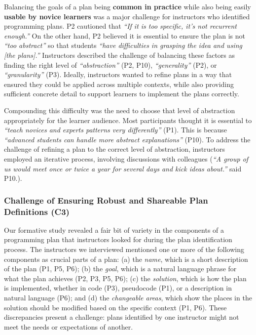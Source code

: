 Balancing the goals of a plan being \textbf{common in practice} while also being easily \textbf{usable by novice learners} was a major challenge for instructors who identified programming plans. 
P2 cautioned that \textit{``If it is too specific, it's not recurrent enough.''} On the other hand, P2 believed it is essential to ensure the plan is not \textit{``too abstract''} so that students \textit{``have difficulties in grasping the idea and using [the plans].''} Instructors described the challenge of balancing these factors as finding the right level of \textit{``abstraction''} (P2, P10), \textit{``generality''} (P2), or \textit{``granularity''} (P3). Ideally, instructors wanted to refine plans in a way that ensured they could be applied across multiple contexts, while also providing sufficient concrete detail to support learners to implement the plans correctly. 

Compounding this difficulty was the need to choose that level of abstraction appropriately for the learner audience. Most participants thought it is essential to \textit{``teach novices and experts patterns very differently''} (P1). This is because \textit{``advanced students can handle more abstract explanations''} (P10). 
To address the challenge of refining a plan to the correct level of abstraction, instructors employed an iterative process, involving discussions with colleagues (\textit{``A group of us would meet once or twice a year for several days and kick ideas about.''} said P10.). 

\subsubsection{Challenge of Ensuring Robust and Shareable Plan Definitions (C3)}
\label{sec:challenges_robust_shareable}
Our formative study revealed a fair bit of variety in the components of a programming plan that instructors looked for during the plan identification process. The instructors we interviewed mentioned one or more of the following components as crucial parts of a plan: (a) the \textit{name}, which is a short description of the plan (P1, P5, P6); (b) the \textit{goal}, which is a natural language phrase for what the plan achieves (P2, P3, P5, P6); (c) the \textit{solution}, which is how the plan is implemented, whether in code (P3), pseudocode (P1), or a description in natural language (P6); and (d) the \textit{changeable areas}, which show the places in the solution should be modified based on the specific context (P1, P6). These discrepancies present a challenge: plans identified by one instructor might not meet the needs or expectations of another. 

